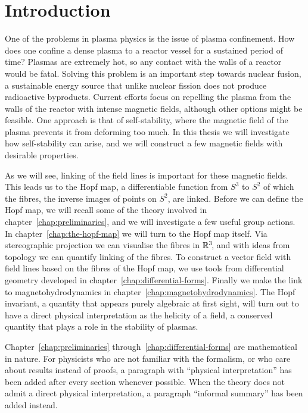 
\chapter{Introduction}
One of the problems in plasma physics is the issue of plasma confinement.
How does one confine a dense plasma to a reactor vessel for a sustained period of time?
Plasmas are extremely hot,
so any contact with the walls of a reactor would be fatal.
Solving this problem is an important step towards nuclear fusion,
a sustainable energy source that unlike nuclear fission does not produce radioactive byproducts.
Current efforts focus on repelling the plasma
from the walls of the reactor with intense magnetic fields,
although other options might be feasible.
One approach is that of self-stability,
where the magnetic field of the plasma prevents it from deforming too much.
In this thesis we will investigate how self-stability can arise,
and we will construct a few magnetic fields with desirable properties.

As we will see,
linking of the field lines is important for these magnetic fields.
This leads us to the Hopf map,
a differentiable function from $S^3$ to $S^2$ of which the fibres,
the inverse images of points on $S^2\!$,
are linked.
Before we can define the Hopf map,
we will recall some of the theory involved in chapter~\ref{chap:preliminaries},
and we will investigate a few useful group actions.
In chapter~\ref{chap:the-hopf-map} we will turn to the Hopf map itself.
Via stereographic projection we can visualise the fibres in $\mathbb{R}^3\!$,
and with ideas from topology we can quantify linking of the fibres.
To construct a vector field with field lines
based on the fibres of the Hopf map,
we use tools from differential geometry developed in chapter~\ref{chap:differential-forms}.
Finally we make the link to magnetohydrodynamics in chapter~\ref{chap:magnetohydrodynamics}.
The Hopf invariant,
a quantity that appears purely algebraic at first sight,
will turn out to have a direct physical interpretation as the helicity of a field,
a conserved quantity that plays a role in the stability of plasmas.

Chapter~\ref{chap:preliminaries} through~\ref{chap:differential-forms}
are mathematical in nature.
For physicists who are not familiar with the formalism,
or who care about results instead of proofs,
a paragraph with “physical interpretation” has been added after every section whenever possible.
When the theory does not admit a direct physical interpretation,
a paragraph “informal summary” has been added instead.

